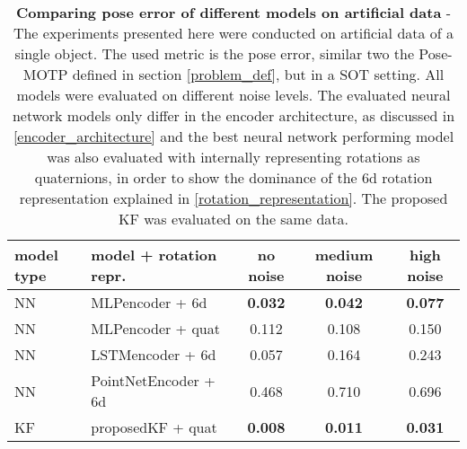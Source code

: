 \documentclass[12pt,a4paper]{article}
\begin{document}
\begin{table}[h!]
	\centering
	\begin{tabular}{|l|l |c| c| c|} 
		\hline
		model type & model + rotation repr. & no noise & medium noise & high noise \\ \hline
		\hline
		NN & MLPencoder + 6d & \textbf{0.032} & \textbf{0.042} & \textbf{0.077} \\ \hline
		NN & MLPencoder + quat & 0.112 & 0.108 & 0.150 \\ \hline
		NN & LSTMencoder + 6d & 0.057 & 0.164 & 0.243 \\ \hline
		NN & PointNetEncoder + 6d & 0.468 & 0.710 & 0.696 \\ \hline \hline
		KF & proposedKF + quat       & \textbf{0.008} & \textbf{0.011} & \textbf{0.031} \\
		\hline
	\end{tabular}\\
	\bigskip
	\caption{\textbf{Comparing pose error of different models on artificial data} - The experiments presented here were conducted on artificial data of a single object. The used metric is the pose error, similar two the Pose-MOTP defined in section \ref{problem_def}, but in a SOT setting. All models were evaluated on different noise levels. The evaluated neural network models only differ in the encoder architecture, as discussed in \ref{encoder_architecture} and the best neural network performing model was also evaluated with internally representing rotations as quaternions, in order to show the dominance of the 6d rotation representation explained in \ref{rotation_representation}.  The proposed KF was evaluated on the same data. }
	\label{pose_error_results}
\end{table}
\end{document}

